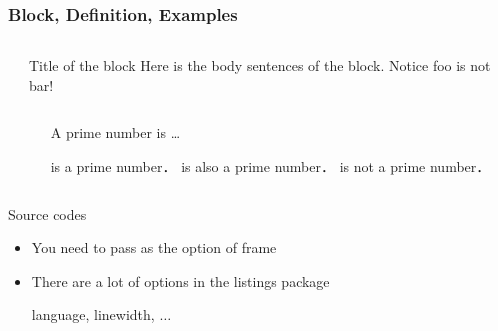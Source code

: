 \begin{frame}[fragile]
  \frametitle{Block, Definition, Examples}
  \begin{columns}
    \begin{column}{0.52\textwidth}
      
    \end{column}
    \begin{column}{0.48\textwidth}
      \begin{block}{Title of the block}
        Here is the body sentences of the block.
        Notice foo is not bar!
      \end{block}
    \end{column}
  \end{columns}
  \begin{columns}
    \begin{column}{0.52\textwidth}
      
    \end{column}
    \begin{column}{0.48\textwidth}
      \begin{definition}
        A prime number is \dots 
      \end{definition}

      \begin{example}   
        \begin{itemize}
           is a prime number．
           is also a prime number．
           is not a prime number．
        \end{itemize}
      \end{example}
    \end{column}
  \end{columns}
\end{frame}

\begin{frame}[fragile]{Source codes}
  
  \begin{itemize}
  \item
    You need to pass  as the option of frame
  \item
    There are a lot of options in the listings package
    \begin{itemize}
      \egitem language, linewidth, $\dots$
    \end{itemize}
  \end{itemize}

\end{frame}

